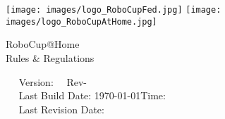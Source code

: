 \begin{titlepage}
  \begin{center}
    {
      \texttt{[image: images/logo\_RoboCupFed.jpg]}
      \hfill
      \texttt{[image: images/logo\_RoboCupAtHome.jpg]}\\[1.23ex]
    }
    \vspace{2.7 cm}
    \hrulefill\par
    {%
      \vspace*{.27cm}
      \Huge{RoboCup@Home}\\[1.23ex]
      \Large Rules \& Regulations \\[2ex]
    }
    \hrulefill\par
    \vfill
    ~~ Version: \YEAR ~~Rev-\svnRevision ~~ \\
    ~~ Last Build Date: \today \quad Time: \the\time ~~ \\
    ~~ Last Revision Date: \svnChangeData ~~ %
  \end{center}
\end{titlepage}

